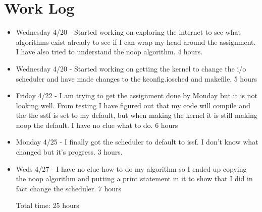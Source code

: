 \documentclass[letterpaper,10pt,titlepage,draftclsnofoot,onecolumn]{IEEEtran}
\begin{document}
\section{Work Log}
\begin{itemize}
\item Wednesday 4/20 - Started working on exploring the internet to see what algorithms exist already to see if I can wrap my head around the assignment. I have also tried to understand the noop algorithm. 4 hours. 
\item Wednesday 4/20 - Started working on getting the kernel to change the i/o scheduler and have made changes to the kconfig.iosched and makefile. 5 hours
\item Friday 4/22 - I am trying to get the assignment done by Monday but it is not looking well. From testing I have figured out that my code will compile and the the sstf is set to my default, but when making the kernel it is still making noop the default. I have no clue what to do. 6 hours 
\item Monday 4/25 - I finally got the scheduler to default to issf. I don't know what changed but it's progress. 3 hours.
\item Weds 4/27 - I have no clue how to do my algorithm so I ended up copying the noop algorithm and putting a print statement in it to show that I did in fact change the scheduler. 7 hours

Total time: 25 hours


\end{itemize}



\end{document}
